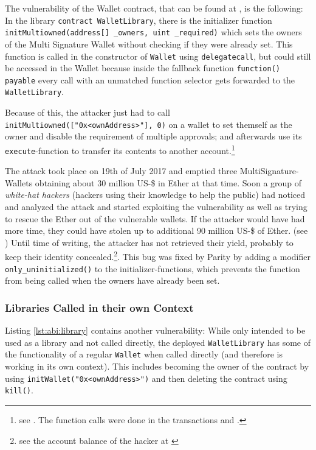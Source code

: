 The vulnerability of the Wallet contract, that can be found at \cite{code:parityenhancedwalletsteal}, is the following: In the library \texttt{contract WalletLibrary}, there is the initializer function \texttt{initMultiowned(address[] _owners, uint _required)} which sets the owners of the Multi Signature Wallet without checking if they were already set. This function is called in the constructor of \texttt{Wallet} using \texttt{de\-le\-gate\-call}, but could still be accessed in the Wallet because inside the fallback function \texttt{function() payable} every call with an unmatched function selector gets forwarded to the \texttt{WalletLibrary}.

Because of this, the attacker just had to call \texttt{initMultiowned(["0x<ownAddress>"], 0)} on a wallet to set themself as the owner and disable the requirement of multiple approvals; and afterwards use its \texttt{execute}-function to transfer its contents to another account.\footnote{see \cite{etheraveum:paritywallethackexplained}. The function calls were done in the transactions \cite{etherscan:walletsteal:inittransaction} and \cite{etherscan:walletsteal:executetransaction}.}

The attack took place on 19th of July 2017 and emptied three MultiSignature-Wallets obtaining about 30 million US-\$ in Ether at that time. Soon a group of \textit{white-hat hackers} (hackers using their knowledge to help the public) had noticed and analyzed the attack and started exploiting the vulnerability as well as trying to rescue the Ether out of the vulnerable wallets. If the attacker would have had more time, they could have stolen up to additional 90 million US-\$ of Ether. (see \cite{freecodecamp:paritywallethackexplained}) Until time of writing, the attacker has not retrieved their yield, probably to keep their identity concealed.\footnote{see the account balance of the hacker at \cite{etherscan:walletsteal:account}}. This bug was fixed by Parity by adding a modifier \texttt{only_uninitialized()} to the initializer-functions, which prevents the function from being called when the owners have already been set.

\subsubsection{Libraries Called in their own Context}
Listing \ref{lst:abi:library} contains another vulnerability: While only intended to be used as a library and not called directly, the deployed \texttt{WalletLibrary} has some of the functionality of a regular \texttt{Wallet} when called directly (and therefore is working in its own context). This includes becoming the owner of the contract by using \texttt{initWallet("0x<ownAddress>")} and then deleting the contract using \texttt{kill()}.

